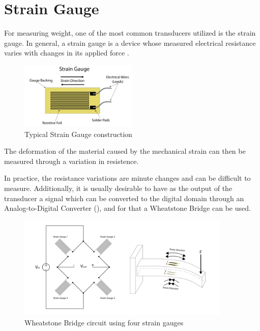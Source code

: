\documentclass[openright]{normas-utf-tex} %
\begin{document}
\section{Strain Gauge}

For measuring weight, one of the most common transducers utilized is the strain
gauge. In general, a strain gauge is a device whose measured electrical
resistance varies with changes in its applied force \cite{Stefanescu}.

\begin{figure}[H]
	\centering
	\includegraphics[width=0.5\textwidth]{./images/straingauge.png}
	\caption[Typical Strain Gauge construction]{Typical Strain Gauge construction}
	\label{fig:gauge1}
\end{figure}

The deformation of the material caused by the mechanical strain can then
be measured through a variation in resistence.

In practice, the resistance variations are minute changes and can be
difficult to measure. Additionally, it is usually desirable to have as the
output of the transducer a signal which can be converted to the digital domain
through an Analog-to-Digital Converter (), and for that a Wheatstone Bridge can be used.

\begin{figure}[H]
	\centering
	\includegraphics[width=0.9\textwidth]{./images/straingauge2.png}
	\caption[Wheatstone Bridge circuit using four strain gauges]{Wheatstone Bridge circuit using four strain gauges}
	\label{fig:gauge2}
\end{figure}
\end{document}
